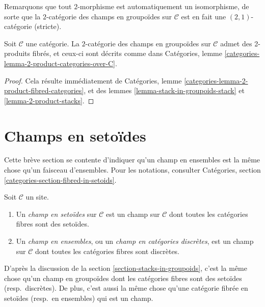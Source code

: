 \noindent
Remarquons que tout $2$-morphisme est automatiquement un isomorphisme, de sorte
que la $2$-catégorie des champs en groupoïdes sur $\mathcal{C}$
est en fait une $(2, 1)$-catégorie (stricte).

\begin{lemma}
\label{lemma-2-product-stacks-in-groupoids}
Soit $\mathcal{C}$ une catégorie.
La $2$-catégorie des champs en groupoïdes sur $\mathcal{C}$
admet des 2-produits fibrés, et ceux-ci sont décrits comme dans
Catégories, lemme \ref{categories-lemma-2-product-categories-over-C}.
\end{lemma}

\begin{proof}
Cela résulte immédiatement de
Catégories, lemme \ref{categories-lemma-2-product-fibred-categories},
et des lemmes \ref{lemma-stack-in-groupoids-stack}
et \ref{lemma-2-product-stacks}.
\end{proof}




\section{Champs en setoïdes}
\label{section-stacks-in-setoids}

\noindent
Cette brève section se contente d'indiquer qu'un champ en ensembles
est la même chose qu'un faisceau d'ensembles. Pour les notations, consulter
Catégories, section \ref{categories-section-fibred-in-setoids}.

\begin{definition}
\label{definition-stack-in-sets}
Soit $\mathcal{C}$ un site.
\begin{enumerate}
\item Un {\it champ en setoïdes} sur $\mathcal{C}$
est un champ sur $\mathcal{C}$ dont toutes les catégories fibres sont des
setoïdes.
\item Un {\it champ en ensembles}, ou un {\it champ en catégories discrètes},
est un champ sur $\mathcal{C}$ dont toutes les catégories fibres sont discrètes.
\end{enumerate}
\end{definition}

\noindent
D'après la discussion de la
section \ref{section-stacks-in-groupoids},
c'est la même chose qu'un champ en groupoïdes dont les catégories fibres
sont des setoïdes (resp.\ discrètes). De plus, c'est aussi la même chose
qu'une catégorie fibrée en setoïdes (resp.\ en ensembles) qui est un champ.

